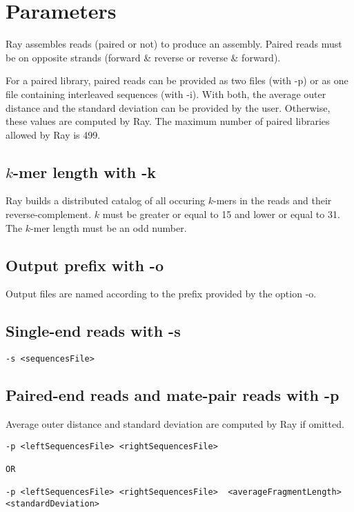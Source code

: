\documentclass{article}
\begin{document}
\section{Parameters}

Ray assembles reads (paired or not) to produce an assembly.
Paired reads must be on opposite strands (forward \& reverse or reverse \& forward).

For a paired library, paired reads can be provided as two files (with -p) or as one file containing interleaved
sequences (with -i).
With both, the average outer distance and the standard deviation can be provided by the user. Otherwise, these values are
computed by Ray.
The maximum  number of paired libraries allowed by Ray is 499.




\subsection{$k$-mer length with -k}

Ray builds a distributed catalog of all occuring $k$-mers in the reads and their reverse-complement. $k$ must be greater or equal to 15 and lower or equal to 31. The $k$-mer length must be an odd number.

\subsection{Output prefix with -o}

Output files are named according to the prefix provided by the option -o.

\subsection{Single-end reads with -s}

\begin{verbatim}
-s <sequencesFile>
\end{verbatim}

\subsection{Paired-end reads and mate-pair reads with -p}

Average outer distance and standard deviation are computed by Ray if omitted.

\begin{verbatim}
-p <leftSequencesFile> <rightSequencesFile>  

OR

-p <leftSequencesFile> <rightSequencesFile>  <averageFragmentLength> <standardDeviation> 
\end{verbatim}
\end{document}
